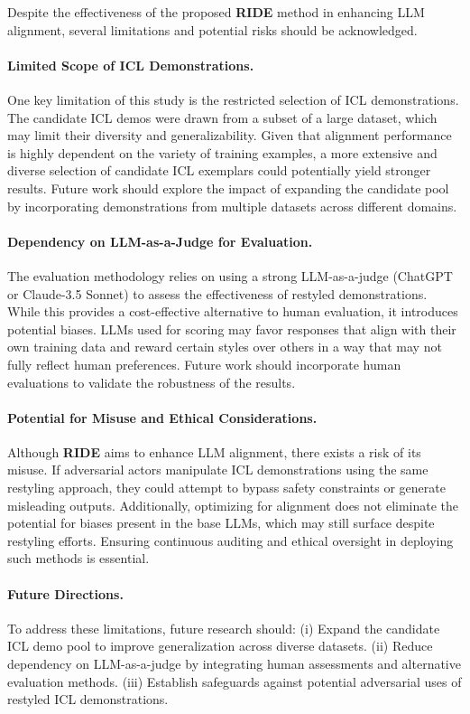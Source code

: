 Despite the effectiveness of the proposed \textbf{RIDE} method in enhancing LLM alignment, several limitations and potential risks should be acknowledged.

\paragraph{Limited Scope of ICL Demonstrations.} One key limitation of this study is the restricted selection of ICL demonstrations. The candidate ICL demos were drawn from a subset of a large dataset, which may limit their diversity and generalizability. Given that alignment performance is highly dependent on the variety of training examples, a more extensive and diverse selection of candidate ICL exemplars could potentially yield stronger results. Future work should explore the impact of expanding the candidate pool by incorporating demonstrations from multiple datasets across different domains.

\paragraph{Dependency on LLM-as-a-Judge for Evaluation.} The evaluation methodology relies on using a strong LLM-as-a-judge (ChatGPT or Claude-3.5 Sonnet) to assess the effectiveness of restyled demonstrations. While this provides a cost-effective alternative to human evaluation, it introduces potential biases. LLMs used for scoring may favor responses that align with their own training data and reward certain styles over others in a way that may not fully reflect human preferences. Future work should incorporate human evaluations to validate the robustness of the results.

\paragraph{Potential for Misuse and Ethical Considerations.} Although \textbf{RIDE} aims to enhance LLM alignment, there exists a risk of its misuse. If adversarial actors manipulate ICL demonstrations using the same restyling approach, they could attempt to bypass safety constraints or generate misleading outputs. Additionally, optimizing for alignment does not eliminate the potential for biases present in the base LLMs, which may still surface despite restyling efforts. Ensuring continuous auditing and ethical oversight in deploying such methods is essential.

\paragraph{Future Directions.} To address these limitations, future research should: (i) Expand the candidate ICL demo pool to improve generalization across diverse datasets.
(ii) Reduce dependency on LLM-as-a-judge by integrating human assessments and alternative evaluation methods.
(iii) Establish safeguards against potential adversarial uses of restyled ICL demonstrations.
